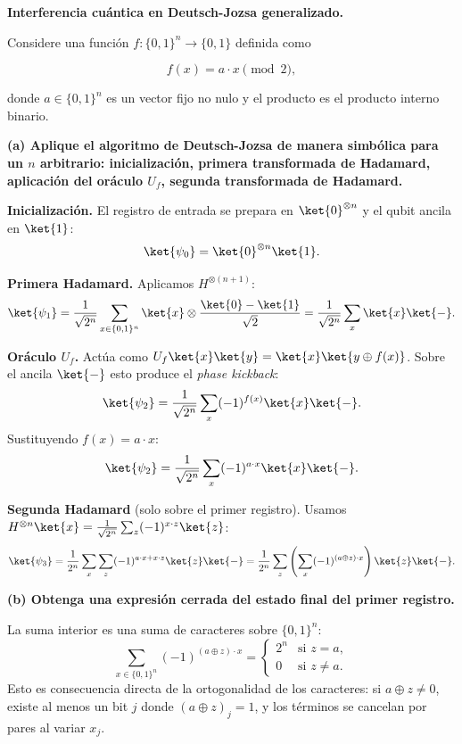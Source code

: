 {\bfseries Interferencia cuántica en Deutsch-Jozsa generalizado.

Considere una función $f : \{0,1\}^n \to \{0,1\}$ definida como

$$
    f(x) = a \cdot x \pmod 2,
$$

donde $a \in \{0,1\}^n$ es un vector fijo no nulo y el producto es el producto interno binario.
}

{\bfseries (a) Aplique el algoritmo de Deutsch-Jozsa de manera simbólica para un $n$ arbitrario: inicialización, primera transformada de Hadamard, aplicación del oráculo $U_f$, segunda transformada de Hadamard.}

\textbf{Inicialización.} El registro de entrada se prepara en $\ket{0}^{\otimes n}$ y el qubit ancila en $\ket{1}$:
$$
    \ket{\psi_0} = \ket{0}^{\otimes n} \ket{1}.
$$

\textbf{Primera Hadamard.} Aplicamos $H^{\otimes (n+1)}$:
$$
    \ket{\psi_1} = \frac{1}{\sqrt{2^n}} \sum_{x \in \{0,1\}^n} \ket{x} \otimes \frac{\ket{0} - \ket{1}}{\sqrt{2}} = \frac{1}{\sqrt{2^n}} \sum_{x} \ket{x} \ket{-}.
$$

\textbf{Oráculo $U_f$.} Actúa como $U_f \ket{x}\ket{y} = \ket{x}\ket{y \oplus f(x)}$. Sobre el ancila $\ket{-}$ esto produce el \emph{phase kickback}:
$$
    \ket{\psi_2} = \frac{1}{\sqrt{2^n}} \sum_{x} (-1)^{f(x)} \ket{x} \ket{-}.
$$
Sustituyendo $f(x) = a \cdot x$:
$$
    \ket{\psi_2} = \frac{1}{\sqrt{2^n}} \sum_{x} (-1)^{a \cdot x} \ket{x} \ket{-}.
$$

\textbf{Segunda Hadamard} (solo sobre el primer registro). Usamos $H^{\otimes n}\ket{x} = \frac{1}{\sqrt{2^n}} \sum_{z} (-1)^{x \cdot z} \ket{z}$:
$$
    \ket{\psi_3} = \frac{1}{2^n} \sum_{x} \sum_{z} (-1)^{a \cdot x + x \cdot z} \ket{z} \ket{-} = \frac{1}{2^n} \sum_{z} \left(\sum_{x} (-1)^{(a \oplus z) \cdot x}\right) \ket{z} \ket{-}.
$$

\vspace{0.5cm}

{\bfseries (b) Obtenga una expresión cerrada del estado final del primer registro.}

La suma interior es una suma de caracteres sobre $\{0,1\}^n$:
$$
    \sum_{x \in \{0,1\}^n} (-1)^{(a \oplus z) \cdot x} = \begin{cases} 2^n & \text{si } z = a, \\ 0 & \text{si } z \neq a. \end{cases}
$$
Esto es consecuencia directa de la ortogonalidad de los caracteres: si $a \oplus z \neq 0$, existe al menos un bit $j$ donde $(a \oplus z)_j = 1$, y los términos se cancelan por pares al variar $x_j$.

